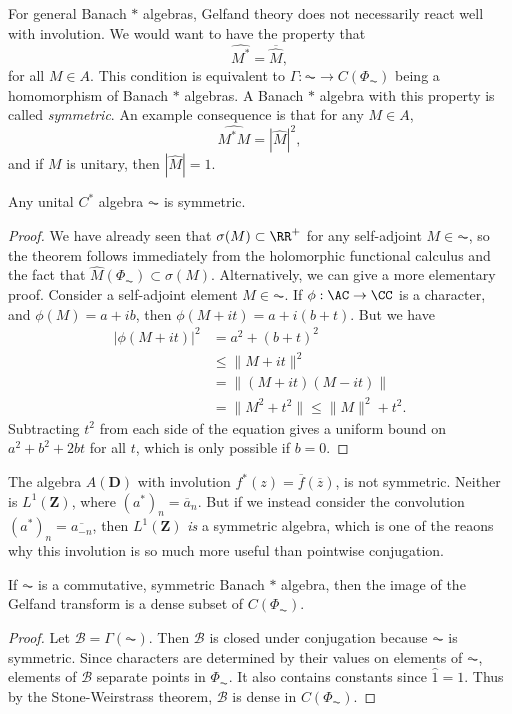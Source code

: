 For general Banach $*$ algebras, Gelfand theory does not necessarily react well with involution. We would want to have the property that
%
\[ \widehat{M^*} = \overline{\widehat{M}}, \]
%
for all $M \in A$. This condition is equivalent to $\Gamma: \AC \to C(\Phi_{\AC})$ being a homomorphism of Banach $*$ algebras. A Banach $*$ algebra with this property is called \emph{symmetric}. An example consequence is that for any $M \in A$,
%
\[ \widehat{M^* M} = |\widehat{M}|^2, \]
%
and if $M$ is unitary, then $|\widehat{M}| = 1$.

\begin{lemma}
    Any unital $C^*$ algebra $\AC$ is symmetric.
\end{lemma}
\begin{proof}
    We have already seen that $\sigma(M) \subset \RR^+$ for any self-adjoint $M \in \AC$, so the theorem follows immediately from the holomorphic functional calculus and the fact that $\widehat{M}(\Phi_{\AC}) \subset \sigma(M)$. Alternatively, we can give a more elementary proof. Consider a self-adjoint element $M \in \AC$. If $\phi: \AC \to \CC$ is a character, and $\phi(M) = a + i b$, then $\phi(M + i t) = a + i(b + t)$. But we have
    \begin{align*}
        |\phi(M + i t)|^2 &= a^2 + (b + t)^2\\
        &\leq \| M + it \|^2\\
        &= \| (M + it)(M - it) \|\\
        &= \| M^2 + t^2 \| \leq \| M \|^2 + t^2.
    \end{align*}
    Subtracting $t^2$ from each side of the equation gives a uniform bound on $a^2 + b^2 + 2bt$ for all $t$, which is only possible if $b = 0$.
\end{proof}

\begin{remark}
    The algebra $A(\mathbf{D})$ with involution $f^*(z) = \overline{f}(\overline{z})$, is not symmetric. Neither is $L^1(\mathbf{Z})$, where $(a^*)_n = \overline{a}_n$. But if we instead consider the convolution $(a^*)_n = \overline{a_{-n}}$, then $L^1(\mathbf{Z})$ \emph{is} a symmetric algebra, which is one of the reaons why this involution is so much more useful than pointwise conjugation.
\end{remark}

\begin{theorem}
    If $\AC$ is a commutative, symmetric Banach $*$ algebra, then the image of the Gelfand transform is a dense subset of $C(\Phi_{\AC})$.
\end{theorem}
\begin{proof}
    Let $\mathcal{B} = \Gamma(\AC)$. Then $\mathcal{B}$ is closed under conjugation because $\AC$ is symmetric. Since characters are determined by their values on elements of $\AC$, elements of $\mathcal{B}$ separate points in $\Phi_{\AC}$. It also contains constants since $\widehat{1} = 1$. Thus by the Stone-Weirstrass theorem, $\mathcal{B}$ is dense in $C(\Phi_{\AC})$.
\end{proof}

